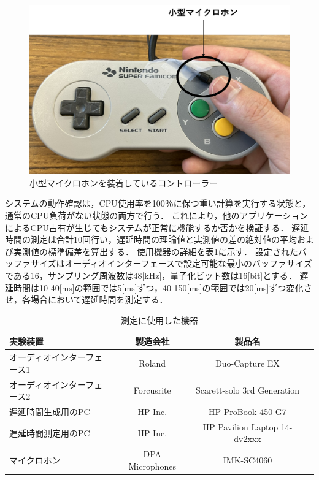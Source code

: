 \begin{figure}[bt]
  \centering
  \includegraphics[scale=0.35]{figures/DelayCheck/SuperFamicom_delayCheck.pdf}
  \caption{小型マイクロホンを装着しているコントローラー}
  \label{fig:super_famicom}
\end{figure}
システムの動作確認は，CPU使用率を100％に保つ重い計算を実行する状態と，通常のCPU負荷がない状態の両方で行う．
これにより，他のアプリケーションによるCPU占有が生じてもシステムが正常に機能するか否かを検証する．
遅延時間の測定は合計10回行い，遅延時間の理論値と実測値の差の絶対値の平均および実測値の標準偏差を算出する．
使用機器の詳細を表\ref{table:device_delay_check}に示す．
設定されたバッファサイズはオーディオインターフェースで設定可能な最小のバッファサイズである16，サンプリング周波数は48[kHz]，量子化ビット数は16[bit]とする．
遅延時間は10-40[ms]の範囲では5[ms]ずつ，40-150[ms]の範囲では20[ms]ずつ変化させ，各場合において遅延時間を測定する．
\begin{table}[tbp]
  \caption{測定に使用した機器}
  \label{table:device_delay_check}
  \centering
  \begin{tabular}{lccc}
    \hline
    実験装置 & 製造会社 & 製品名\\
    \hline \hline
    オーディオインターフェース1  & Roland & Duo-Capture EX\\
    オーディオインターフェース2  & Forcusrite & Scarett-solo 3rd Generation\\
    遅延時間生成用のPC  & HP Inc. & HP ProBook 450 G7\\
    遅延時間測定用のPC  & HP Inc. & HP Pavilion Laptop 14-dv2xxx\\
    マイクロホン  & DPA Microphones & IMK-SC4060
\\
    \hline
  \end{tabular}
\end{table}

